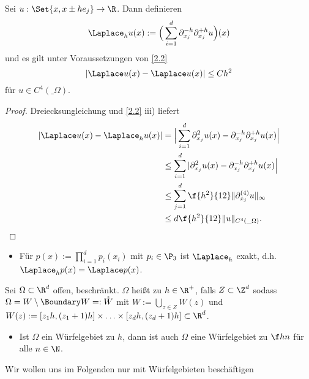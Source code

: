 \begin{kor} \label{2.3} 
	Sei $u : \Set{x, x \pm h e_j} \to \R$.
	Dann definieren
	\begin{equation} \label{eq:2.1}
		\Laplace_h u(x) :=
		\Big(\sum_{i=1}^d \partial_{x_j}^{-h} \partial_{x_j}^{+h} u \Big) (x)
	\end{equation}
	und es gilt unter Voraussetzungen von \ref{2.2}
	\[
		|\Laplace u(x) - \Laplace u(x)| \le C h^2
	\]
	für $u \in C^4(\_\Omega)$.
	\begin{proof}
		Dreiecksungleichung und \ref{2.2} iii) liefert
		\begin{align*}
			|\Laplace u(x) - \Laplace_h u(x)|
			&= \Big| \sum_{i=1}^d \partial_{x_j}^2 u(x) - \partial_{x_j}^{-h} \partial_{x_j}^{+h} u(x) \Big| \\
			&\le \sum_{i=1}^d | \partial_{x_j}^2 u(x) - \partial_{x_j}^{-h} \partial_{x_j}^{+h} u(x) \Big| \\
			&\le \sum_{j=1}^d \f {h^2}{12} \|\partial_{x_j}^{(4)} u\|_\infty \\
			&\le d \f {h^2}{12} \|u\|_{C^4(\_\Omega)}.
		\end{align*}
	\end{proof}
	\begin{note}
		\begin{itemize}
			\item
				Für $p(x) := \prod_{i=1}^d p_i(x_i)$ mit $p_i \in \P_3$ ist $\Laplace_h$ exakt, d.h. $\Laplace_h p(x) = \Laplace p(x)$.
		\end{itemize}
	\end{note}
\end{kor}


\begin{df}[Würfelgebiet] \label{2.4}
	Sei $\Omega \subset \R^d$ offen, beschränkt.
	$\Omega$ heißt  zu $h \in \R^+$, falls $Z \subset \Z^d$ sodass $\Omega = W \setminus \Boundary W =: \mathring W$ mit $W := \bigcup_{z \in Z} W(z)$ und $W(z) := [z_1h , (z_1+1)h] \times \dotsc \times [z_d h, (z_d+1)h] \subset \R^d$.
	\begin{note}
		\begin{itemize}
			\item
				Ist $\Omega$ ein Würfelgebiet zu $h$, dann ist auch $\Omega$ eine Würfelgebiet zu $\f hn$ für alle $n \in \N$.
		\end{itemize}
	\end{note}
\end{df}

Wir wollen uns im Folgenden nur mit Würfelgebieten beschäftigen

